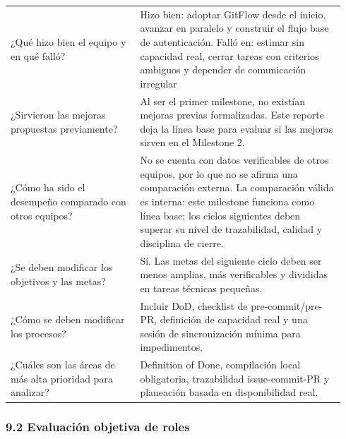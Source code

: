 \documentclass[11pt,a4paper]{article}
\begin{document}
\begin{longtable}{P{0.36\linewidth}P{0.58\linewidth}}
¿Qué hizo bien el equipo y en qué falló? & Hizo bien: adoptar GitFlow desde el inicio, avanzar en paralelo y construir el flujo base de autenticación. Falló en: estimar sin capacidad real, cerrar tareas con criterios ambiguos y depender de comunicación irregular \\
¿Sirvieron las mejoras propuestas previamente? & Al ser el primer milestone, no existían mejoras previas formalizadas. Este reporte deja la línea base para evaluar si las mejoras sirven en el Milestone 2. \\
¿Cómo ha sido el desempeño comparado con otros equipos? & No se cuenta con datos verificables de otros equipos, por lo que no se afirma una comparación externa. La comparación válida es interna: este milestone funciona como línea base; los ciclos siguientes deben superar su nivel de trazabilidad, calidad y disciplina de cierre. \\
¿Se deben modificar los objetivos y las metas? & Sí. Las metas del siguiente ciclo deben ser menos amplias, más verificables y divididas en tareas técnicas pequeñas. \\
¿Cómo se deben modificar los procesos? & Incluir DoD, checklist de pre-commit/pre-PR, definición de capacidad real y una sesión de sincronización mínima para impedimentos. \\
¿Cuáles son las áreas de más alta prioridad para analizar? & Definition of Done, compilación local obligatoria, trazabilidad issue-commit-PR y planeación basada en disponibilidad real. \\
\end{longtable}
\endgroup

\subsubsection{9.2 Evaluación objetiva de roles}
\end{document}
